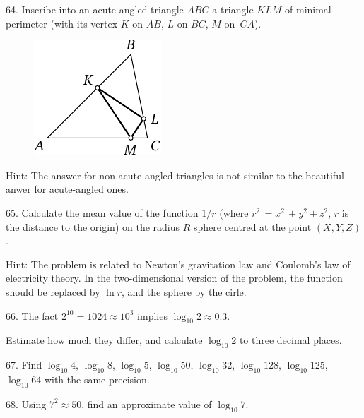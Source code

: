 \begin{problem}{64.}
	Inscribe into an acute-angled triangle $ABC$ a triangle $KLM$ of minimal perimeter
	(with its vertex $K$ on $AB$, $L$ on $BC$, $M$ on~$CA$).
	\begin{figure}[h]
	\centering
	\includegraphics{taskbook-48} 
	\end{figure}

	\begin{note}{Hint:}
		The answer for non-acute-angled triangles is not similar to the beautiful anwer for acute-angled ones.
	\end{note}
\end{problem}

\begin{problem}{65.}
	Calculate the mean value of the function  $1/r$ (where
	$r^2\,=x^2\,+y^2+z^2$, $r$ is the distance to the origin) on the radius 
	$R$ sphere centred at the point $(X,Y,Z)$.

	\medskip
	\begin{note}{Hint:}
		The problem is related to Newton's gravitation law and Coulomb's law of electricity theory.
		In the two-dimensional version of the problem, the function should be replaced by $\ln r$, and the sphere by the cirle.
	\end{note}
\end{problem}

\begin{problem}{66.}
	The fact $2^{10}=1024 \approx 10^3$ implies
	$\log_{10} 2 \approx 0{.}3$.

	Estimate how much they differ, and calculate $\log_{10} 2$ to three decimal places. 
\end{problem}

\begin{problem}{67.}
	Find $\log_{10} 4$, $\log_{10} 8$,
	$\log_{10} 5$, $\log_{10} 50$, $\log_{10} 32$, $\log_{10} 128$,
	$\log_{10} 125$, $\log_{10} 64$ with the same precision.
\end{problem}

\begin{problem}{68.} 
	Using $7^2 \approx 50$, find an approximate value of $\log_{10} 7$.
\end{problem}


